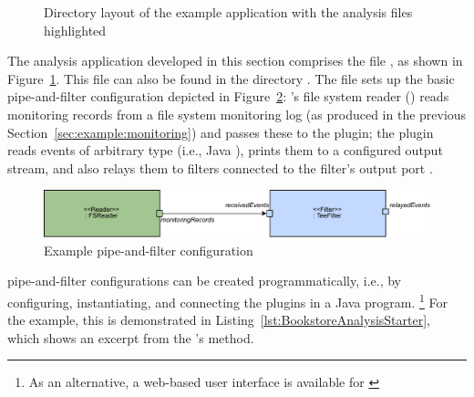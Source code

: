 \begin{figure}[H]
\begin{graybox}
\end{graybox}
\caption{Directory layout of the example application with the analysis files highlighted}
\label{lst:analysisExampleLayout}
\end{figure}

\noindent The analysis application developed in this section comprises the file %
, as shown in Figure~\ref{lst:analysisExampleLayout}. %
This file can also be found in the directory \dir{\manualInstrumentedBookstoreApplicationDirDistro{}/}.
The file sets up the basic pipe-and-filter configuration depicted in Figure~\ref{fig:example:ch2:pipe-and-filter}: %
\Kieker{}'s file system reader () reads monitoring records %
from a file system monitoring log (as produced in the previous Section~\ref{sec:example:monitoring}) %
and passes these to the  plugin; the  plugin %
reads events of arbitrary type (i.e., Java ), prints them to a %
configured output stream, and also relays them to filters connected to the %
filter's output port . %

\begin{figure}[h]
\includegraphics[width=\textwidth]{images/ch2-example-pnp}
\caption{Example pipe-and-filter configuration}
\label{fig:example:ch2:pipe-and-filter}
\end{figure}

\enlargethispage{0.5cm}

\KiekerAnalysisPart{} pipe-and-filter configurations can %
be created programmatically, i.e., by configuring, instantiating, and %
connecting the plugins in a Java program.%
\footnote{As an alternative, a web-based user interface is available for \Kieker{} \cite{KiekerWebSite}} %
For the example, this is demonstrated in Listing~\ref{lst:BookstoreAnalysisStarter}, %
which shows an excerpt from the 's  %
method. %

